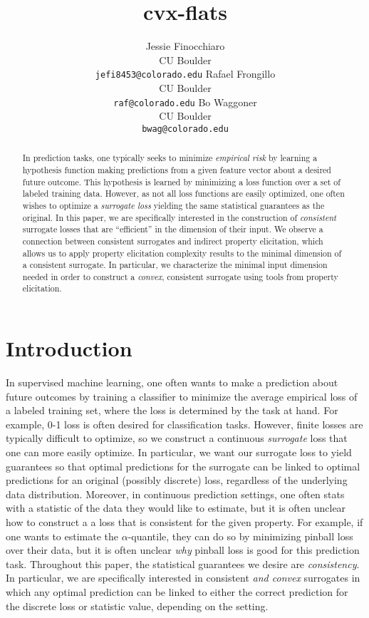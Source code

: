 \documentclass{article}
\title{cvx-flats}
\author{%
  Jessie Finocchiaro\\
  CU Boulder\\
  \texttt{jefi8453@colorado.edu} 
  \And
   Rafael Frongillo\\
   CU Boulder\\
   \texttt{raf@colorado.edu} 
   \And
   Bo Waggoner\\
   CU Boulder \\
   \texttt{bwag@colorado.edu} 
}
\begin{document}
\maketitle

\begin{abstract}
	In prediction tasks, one typically seeks to minimize \emph{empirical risk} by learning a hypothesis function making predictions from a given feature vector about a desired future outcome.
	This hypothesis is learned by minimizing a loss function over a set of labeled training data.
	However, as not all loss functions are easily optimized, one often wishes to optimize a \emph{surrogate loss} yielding the same statistical guarantees as the original.
	In this paper, we are specifically interested in the construction of \emph{consistent} surrogate losses that are ``efficient'' in the dimension of their input.
	We observe a connection between consistent surrogates and indirect property elicitation, which allows us to apply property elicitation complexity results to the minimal dimension of a consistent surrogate.
	In particular, we characterize the minimal input dimension needed in order to construct a \emph{convex}, consistent surrogate using tools from property elicitation.
\end{abstract}

\section{Introduction}\label{sec:intro}

In supervised machine learning, one often wants to make a prediction about future outcomes by training a classifier to minimize the average empirical loss of a labeled training set, where the loss is determined by the task at hand.
For example, 0-1 loss is often desired for classification tasks.
However, finite losses are typically difficult to optimize, so we construct a continuous \emph{surrogate} loss that one can more easily optimize.
In particular, we want our surrogate loss to yield guarantees so that optimal predictions for the surrogate can be linked to optimal predictions for an original (possibly discrete) loss, regardless of the underlying data distribution.
Moreover, in continuous prediction settings, one often stats with a statistic of the data they would like to estimate, but it is often unclear how to construct a a loss that is consistent for the given property.
For example, if one wants to estimate the $\alpha$-quantile, they can do so by minimizing pinball loss over their data, but it is often unclear \emph{why} pinball loss is good for this prediction task.
Throughout this paper, the statistical guarantees we desire are \emph{consistency}.
In particular, we are specifically interested in consistent \emph{and convex} surrogates in which any optimal prediction can be linked to either the correct prediction for the discrete loss or statistic value, depending on the setting. 
\end{document}

